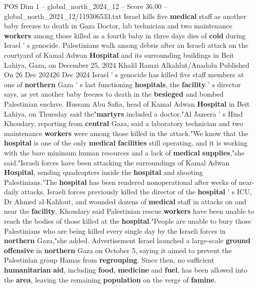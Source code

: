 \begin{textsample}{POS Dim 1 – global\_north\_2024\_12 – Score 36.00 – global\_north\_2024\_12/119306533.txt}  \label{ex:f1_pos_223}
Israel kills five \textbf{medical} staff as another baby freezes to death in Gaza Doctor, lab technician and two maintenance \textbf{workers} among those killed as a fourth baby in three days dies of \textbf{cold} during Israel ' s genocide.
Palestinians walk among debris after an Israeli attack on the courtyard of Kamal Adwan \textbf{Hospital} and its surrounding buildings in Beit Lahiya, Gaza, on December 25, 2024 Khalil Ramzi Alkahlut/Anadolu Published On 26 Dec 202426 Dec 2024 Israel ' s genocide has killed five staff members at one of \textbf{northern} Gaza ' s last functioning \textbf{hospitals}, the \textbf{facility} ' s director says, as yet another baby freezes to death in the \textbf{besieged} and bombed Palestinian enclave.
Hussam Abu Safia, head of Kamal Adwan \textbf{Hospital} in Beit Lahiya, on Thursday said the"\textbf{martyrs} included a doctor."Al Jazeera ' s Hind Khoudary, reporting from \textbf{central} Gaza, said a laboratory technician and two maintenance \textbf{workers} were among those killed in the attack."We know that the \textbf{hospital} is one of the only \textbf{medical} \textbf{facilities} still operating, and it is working with the bare minimum human resources and a lack of \textbf{medical} \textbf{supplies},"she said."Israeli forces have been attacking the surroundings of Kamal Adwan \textbf{Hospital}, sending quadcopters inside the \textbf{hospital} and shooting Palestinians."The \textbf{hospital} has been rendered nonoperational after weeks of near-daily attacks.
Israeli forces previously killed the director of the \textbf{hospital} ' s ICU, Dr Ahmed al-Kahlout, and wounded dozens of \textbf{medical} staff in attacks on and near the \textbf{facility}.
Khoudary said Palestinian rescue \textbf{workers} have been unable to reach the bodies of those killed at the \textbf{hospital}."People are unable to bury those Palestinians who are being killed every single day by the Israeli forces in \textbf{northern} Gaza,"she added.
Advertisement Israel launched a large-scale \textbf{ground} \textbf{offensive} in \textbf{northern} Gaza on October 5, saying it aimed to prevent the Palestinian group Hamas from \textbf{regrouping}.
Since then, no sufficient \textbf{humanitarian} \textbf{aid}, including \textbf{food}, \textbf{medicine} and \textbf{fuel}, has been allowed into the \textbf{area}, leaving the remaining \textbf{population} on the verge of \textbf{famine}.

\end{textsample}
